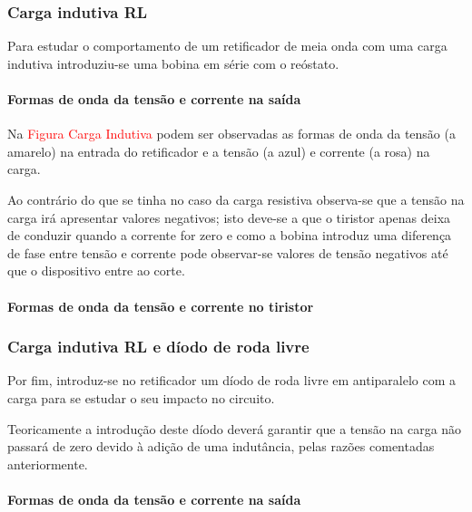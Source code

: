 \documentclass[a4paper,11pt]{article}
\numberwithin{equation}{section}
\begin{document}
\subsubsection{Carga indutiva RL}

Para estudar o comportamento de um retificador de meia onda com uma carga indutiva introduziu-se uma bobina em série com o reóstato.

\paragraph{Formas de onda da tensão e corrente na saída}


Na \textcolor{red}{Figura Carga Indutiva} podem ser observadas as formas de onda da tensão (a amarelo) na entrada do retificador e a tensão (a azul) e corrente (a rosa) na carga.

Ao contrário do que se tinha no caso da carga resistiva observa-se que a tensão na carga irá apresentar valores negativos; isto deve-se a que o tiristor apenas deixa de conduzir quando a corrente for zero e como a bobina introduz uma diferença de fase entre tensão e corrente pode observar-se valores de tensão negativos até que o dispositivo entre ao corte.

\paragraph{Formas de onda da tensão e corrente no tiristor}



\subsubsection{Carga indutiva RL e díodo de roda livre}

Por fim, introduz-se no retificador um díodo de roda livre em antiparalelo com a carga para se estudar o seu impacto no circuito.

Teoricamente a introdução deste díodo deverá garantir que a tensão na carga não passará de zero devido à adição de uma indutância, pelas razões comentadas anteriormente.


\paragraph{Formas de onda da tensão e corrente na saída}
\end{document}
